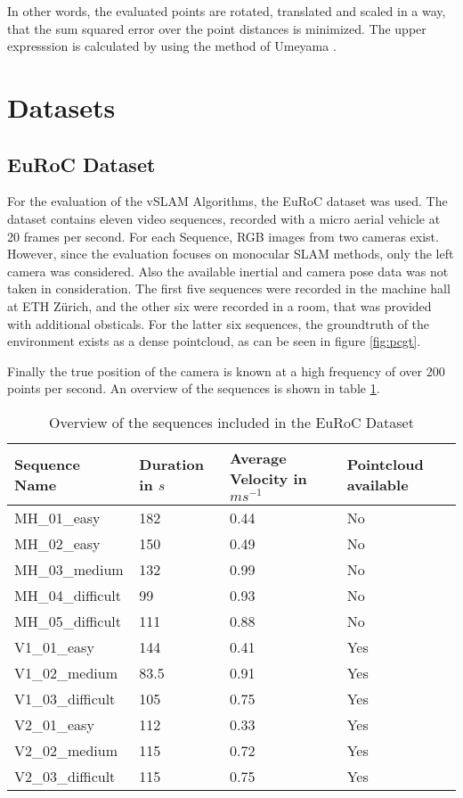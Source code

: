 	In other words, the evaluated points are rotated, translated and scaled in a way, that the sum squared error over the point
	distances is minimized. The upper expresssion is calculated by using the method of Umeyama \cite{ume}. 
	
	
	

\section{Datasets}

	\subsection{EuRoC Dataset}

	For the evaluation of the vSLAM Algorithms, the EuRoC dataset \cite{euroc} was used.
	The dataset contains eleven video sequences, recorded with a micro aerial vehicle at 20 frames per second. 
	For each Sequence, RGB images from two cameras exist. However, since the evaluation
	focuses on monocular SLAM methods, only the left camera was considered. Also the available 
	inertial and camera pose data was not taken in consideration. The first five sequences were recorded in 
	the machine hall at ETH Zürich, and the other six were recorded in a room, that was provided 
	with additional obsticals. For the latter six sequences, the groundtruth of the environment 
	exists as a dense pointcloud, as can be seen in figure \ref{fig:pcgt}.


	Finally the true position of the 
	camera is known at a high frequency of over 200 points per second. 
	An overview of the sequences is shown in table \ref{table:euroctable}.



	\begin{table}
	\caption{Overview of the sequences included in the EuRoC Dataset}
	\begin{tabular}{ |p{3cm}||p{3cm}|p{3cm}|p{3cm}|  }
	\hline
	Sequence Name& Duration in $s$ & Average Velocity in $ms^{-1}$ &Pointcloud available\\
	\hline
	MH\_01\_easy & 182 & 0.44 & No\\
	MH\_02\_easy & 150 & 0.49 & No\\
	MH\_03\_medium & 132 & 0.99 & No\\
	MH\_04\_difficult & 99 & 0.93 & No\\
	MH\_05\_difficult & 111 & 0.88 & No\\
	V1\_01\_easy & 144 & 0.41 & Yes\\
	V1\_02\_medium & 83.5 & 0.91 & Yes\\
	V1\_03\_difficult & 105 & 0.75 & Yes\\
	V2\_01\_easy & 112 & 0.33 & Yes\\
	V2\_02\_medium & 115 & 0.72 & Yes\\
	V2\_03\_difficult & 115 & 0.75 & Yes\\
	\hline
	\end{tabular}
	\label{table:euroctable}
	\end{table}
	
